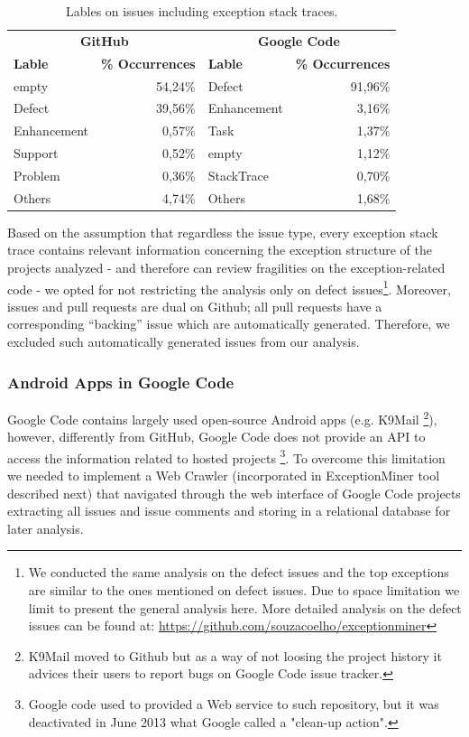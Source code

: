 \documentclass[conference]{IEEEtran}
\begin{document}

\begin{table}
  \centering
  \begin{tabular}{lr|lr}
    \hline
     \multicolumn{2}{c}{\bfseries{GitHub}} &  \multicolumn{2}{c}{\bfseries{Google Code}} \\
      \bfseries{Lable} &  \bfseries{\% Occurrences} &  \bfseries{Lable} &  \bfseries{\% Occurrences} \\
    \hline
empty &	54,24\% & Defect &	91,96\% \\
Defect &	39,56\%  & Enhancement  &	3,16\% \\
Enhancement &	0,57\% & Task	& 1,37\% \\
Support &	0,52\% & empty &	1,12\% \\
Problem &	0,36\% & StackTrace &	0,70\% \\
Others &	4,74\% &  Others &	1,68\% \\   
  \hline
  \end{tabular}
  \caption{Lables on issues including exception stack traces.}
  \label{tab:lables}
\end{table}

Based on the assumption that regardless the issue type, every exception stack
trace contains relevant information concerning the exception structure of the
projects analyzed - and therefore can review fragilities on the exception-related code -  
we opted for not restricting the analysis only on defect
issues\footnote{We conducted the same analysis on the defect issues and the top
exceptions are similar to the ones mentioned on defect issues. Due to space
limitation we limit to present the general analysis here. More detailed analysis
on the defect issues can be found at:
\url{https://github.com/souzacoelho/exceptionminer}}.
 Moreover, issues and pull requests are dual on Github; all pull requests have a corresponding 
``backing'' issue which are automatically generated. Therefore, we excluded such automatically generated
issues from our analysis. 

\subsubsection{Android Apps in Google Code}
Google Code contains largely used open-source Android apps (e.g. K9Mail \footnote{K9Mail moved to Github but as a way of not loosing the project history 
it advices their users to report bugs on Google Code issue tracker.}), however, differently from GitHub, Google Code does not provide an API to access the information related
 to hosted projects \footnote{Google code used to provided a Web service to such repository, but it was deactivated in June 2013 what Google called a "clean-up action".}.
To overcome this limitation we needed to implement a Web Crawler (incorporated in ExceptionMiner tool described next) that navigated 
through the web interface of Google Code projects extracting all issues and issue comments and storing in a relational database for later analysis.
\end{document}
